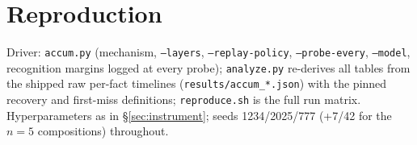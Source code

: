 \documentclass[11pt]{article}
\begin{document}
\appendix
\section{Reproduction}
Driver: \texttt{accum.py} (mechanism, \texttt{--layers}, \texttt{--replay-policy},
\texttt{--probe-every}, \texttt{--model}, recognition margins logged at every probe);
\texttt{analyze.py} re-derives all tables from the shipped raw per-fact timelines
(\texttt{results/accum\_*.json}) with the pinned recovery and first-miss definitions;
\texttt{reproduce.sh} is the full run matrix. Hyperparameters as in \S\ref{sec:instrument}; seeds
1234/2025/777 (+7/42 for the $n{=}5$ compositions) throughout.
\end{document}
